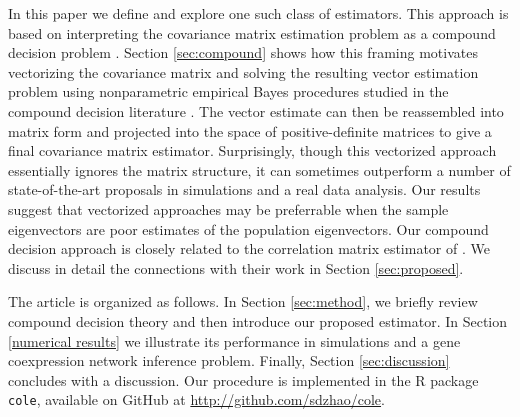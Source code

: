 \documentclass[useAMS,referee,usenatbib]{biom}
\begin{document}

In this paper we define and explore one such class of estimators. This approach is based on interpreting the covariance matrix estimation problem as a compound decision problem \citep{robbins1951asymptotically}. Section \ref{sec:compound} shows how this framing motivates vectorizing the covariance matrix and solving the resulting vector estimation problem using nonparametric empirical Bayes procedures studied in the compound decision literature \citep{jiang2009general, koenker2014convex, efron2019bayes}. The vector estimate can then be reassembled into matrix form and projected into the space of positive-definite matrices to give a final covariance matrix estimator. Surprisingly, though this vectorized approach essentially ignores the matrix structure, it can sometimes outperform a number of state-of-the-art proposals in simulations and a real data analysis. Our results suggest that vectorized approaches may be preferrable when the sample eigenvectors are poor estimates of the population eigenvectors. Our compound decision approach is closely related to the correlation matrix estimator of \citet{dey2018corshrink}. We discuss in detail the connections with their work in Section \ref{sec:proposed}.

The article is organized as follows. In Section \ref{sec:method}, we briefly review compound decision theory and then introduce our proposed estimator. In Section \ref{numerical results} we illustrate its performance in simulations and a gene coexpression network inference problem. Finally, Section \ref{sec:discussion} concludes with a discussion. Our procedure is implemented in the R package \verb|cole|, available on GitHub at \url{http://github.com/sdzhao/cole}.
\end{document}
